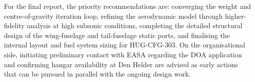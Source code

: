 For the final report, the priority recommendations are: converging the weight and centre-of-gravity iteration loop, refining the aerodynamic model through higher-fidelity analysis at high subsonic conditions, completing the detailed structural design of the wing-fuselage and tail-fuselage static ports, and finalising the internal layout and fuel system sizing for HUG-CFG-303. On the organisational side, initiating preliminary contact with EASA regarding the DOA application and confirming hangar availability at Den Helder are advised as early actions that can be pursued in parallel with the ongoing design work.